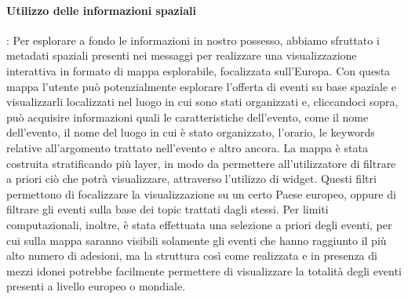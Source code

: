\documentclass[fleqn,10pt]{SelfArx} %
\begin{document}
{\paragraph{Utilizzo delle informazioni spaziali}:
Per esplorare a fondo le informazioni in nostro possesso, abbiamo sfruttato i metadati spaziali presenti nei messaggi per realizzare una visualizzazione interattiva in formato di mappa esplorabile, focalizzata sull'Europa. 
Con questa mappa l'utente può potenzialmente esplorare l'offerta di eventi su base spaziale e visualizzarli localizzati nel luogo in cui sono stati organizzati e, cliccandoci sopra, può acquisire informazioni quali le caratteristiche dell'evento, come il nome dell'evento, il nome del luogo in cui è stato organizzato, l'orario, le keywords relative all'argomento trattato nell'evento e altro ancora. 
La mappa è stata costruita stratificando più layer, in modo da permettere all'utilizzatore di filtrare a priori ciò che potrà visualizzare, attraverso l'utilizzo di widget. 
Questi filtri permettono di focalizzare la visualizzazione su un certo Paese europeo, oppure di filtrare gli eventi sulla base dei topic trattati dagli stessi. 
Per limiti computazionali, inoltre, è stata effettuata una selezione a priori degli eventi, per cui sulla mappa saranno visibili solamente gli eventi che hanno raggiunto il più alto numero di adesioni, ma la struttura così come realizzata e in presenza di mezzi idonei potrebbe facilmente permettere di visualizzare la totalità degli eventi presenti a livello europeo o mondiale.
}
\end{document}
